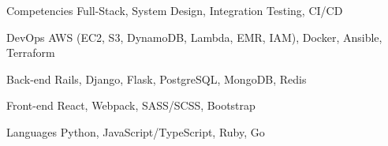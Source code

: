 

\begin{cvskills}

  \cvskill
    {Competencies} %
    {Full-Stack, System Design, Integration Testing, CI/CD}

  \cvskill
    {DevOps} %
    {AWS (EC2, S3, DynamoDB, Lambda, EMR, IAM), Docker, Ansible, Terraform}

  \cvskill
    {Back-end} %
    {Rails, Django, Flask, PostgreSQL, MongoDB, Redis}

  \cvskill
    {Front-end} %
    {React, Webpack, SASS/SCSS, Bootstrap}

  \cvskill
    {Languages} %
    {Python, JavaScript/TypeScript, Ruby, Go}

\end{cvskills}

